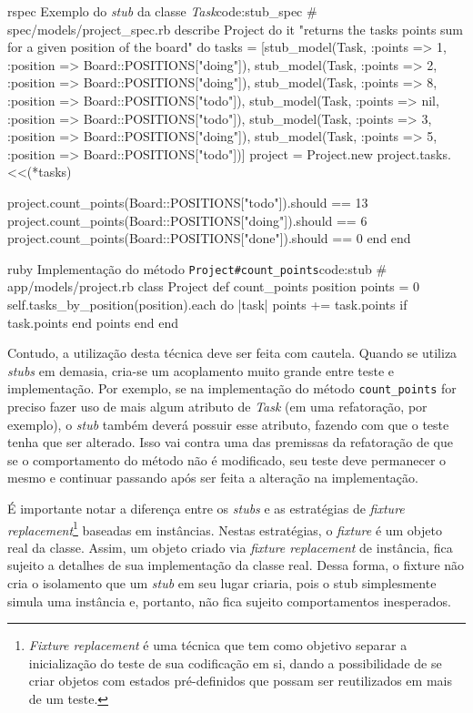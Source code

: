 \begin{mycode}{rspec}%
{Exemplo do \textit{stub} da classe \textit{Task}}{code:stub_spec}
# spec/models/project_spec.rb
describe Project do
  it "returns the tasks points sum for a given position of the board" do
    tasks = [stub_model(Task, :points => 1, :position => Board::POSITIONS["doing"]),
             stub_model(Task, :points => 2, :position => Board::POSITIONS["doing"]),
             stub_model(Task, :points => 8, :position => Board::POSITIONS["todo"]),
             stub_model(Task, :points => nil, :position => Board::POSITIONS["todo"]),
             stub_model(Task, :points => 3, :position => Board::POSITIONS["doing"]),
             stub_model(Task, :points => 5, :position => Board::POSITIONS["todo"])]
    project = Project.new
    project.tasks.<<(*tasks)

    project.count_points(Board::POSITIONS["todo"]).should == 13
    project.count_points(Board::POSITIONS["doing"]).should == 6
    project.count_points(Board::POSITIONS["done"]).should == 0
  end
end
\end{mycode}

\begin{mycode}{ruby}%
{Implementação do método \texttt{Project\#count\_points}}{code:stub}
# app/models/project.rb
class Project
  def count_points position
    points = 0
    self.tasks_by_position(position).each do |task|
      points += task.points if task.points
    end
    points
  end
end
\end{mycode}

Contudo, a utilização desta técnica deve ser feita com cautela. Quando se utiliza \textit{stubs} em demasia, cria-se um acoplamento muito grande entre teste e implementação. Por exemplo, se na implementação do método \texttt{count\_points} for preciso fazer uso de mais algum atributo de \textit{Task} (em uma refatoração, por exemplo), o \textit{stub} também deverá possuir esse atributo, fazendo com que o teste tenha que ser alterado. Isso vai contra uma das premissas da refatoração de que se o comportamento do método não é modificado, seu teste deve permanecer o mesmo e continuar passando após ser feita a alteração na implementação.

É importante notar a diferença entre os \textit{stubs} e as estratégias de \textit{fixture replacement}\footnote{\textit{Fixture replacement} é uma técnica que tem como objetivo separar a inicialização do teste de sua codificação em si, dando a possibilidade de se criar objetos com estados pré-definidos que possam ser reutilizados em mais de um teste.} baseadas em instâncias. Nestas estratégias, o \textit{fixture} é um objeto real da classe. Assim, um objeto criado via \textit{fixture replacement} de instância, fica sujeito a detalhes de sua implementação da classe real. Dessa forma, o {fixture} não cria o isolamento que um \textit{stub} em seu lugar criaria, pois o stub simplesmente simula uma instância e, portanto, não fica sujeito comportamentos inesperados.


